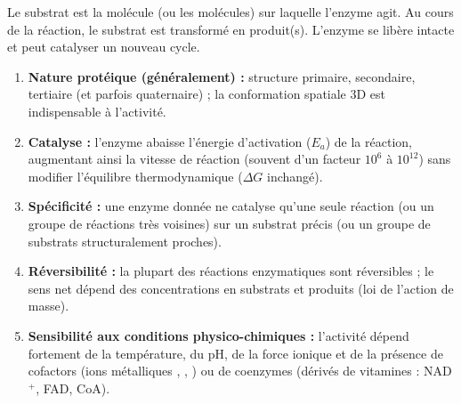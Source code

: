 \documentclass[11pt]{article}
\newcommand{\cle}[1]{{\popxbold\color{popdark}#1}}
\begin{document}
\begin{definition}
Le \cle{substrat} est la molécule (ou les molécules) sur laquelle l'enzyme agit. Au cours de la réaction, le substrat est transformé en \cle{produit(s)}. L'enzyme se libère intacte et peut catalyser un nouveau cycle.
\end{definition}

\begin{propriete}
\begin{enumerate}
\item \textbf{Nature protéique (généralement) :} structure primaire, secondaire, tertiaire (et parfois quaternaire) ; la conformation spatiale 3D est indispensable à l'activité.
\item \textbf{Catalyse :} l'enzyme \cle{abaisse l'énergie d'activation} ($E_a$) de la réaction, augmentant ainsi la vitesse de réaction (souvent d'un facteur $10^6$ à $10^{12}$) sans modifier l'équilibre thermodynamique ($\Delta G$ inchangé).
\item \textbf{Spécificité :} une enzyme donnée ne catalyse qu'une seule réaction (ou un groupe de réactions très voisines) sur un substrat précis (ou un groupe de substrats structuralement proches).
\item \textbf{Réversibilité :} la plupart des réactions enzymatiques sont réversibles ; le sens net dépend des concentrations en substrats et produits (loi de l'action de masse).
\item \textbf{Sensibilité aux conditions physico-chimiques :} l'activité dépend fortement de la température, du pH, de la force ionique et de la présence de \cle{cofactors} (ions métalliques , , ) ou de \cle{coenzymes} (dérivés de vitamines : NAD$^+$, FAD, CoA).
\end{enumerate}
\end{propriete}
\end{document}
